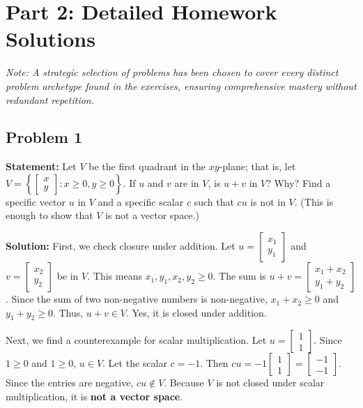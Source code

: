 \documentclass[12pt]{article}
\begin{document}
\newpage

\section{Part 2: Detailed Homework Solutions}
\textit{Note: A strategic selection of problems has been chosen to cover every distinct problem archetype found in the exercises, ensuring comprehensive mastery without redundant repetition.}

\subsection{Problem 1}
\textbf{Statement:} Let $V$ be the first quadrant in the $xy$-plane; that is, let $V = \left\{ \begin{bmatrix} x \\ y \end{bmatrix} : x \ge 0, y \ge 0 \right\}$. If $u$ and $v$ are in $V$, is $u+v$ in $V$? Why? Find a specific vector $u$ in $V$ and a specific scalar $c$ such that $cu$ is not in $V$. (This is enough to show that $V$ is not a vector space.)

\textbf{Solution:}
First, we check closure under addition. Let $u = \begin{bmatrix} x_1 \\ y_1 \end{bmatrix}$ and $v = \begin{bmatrix} x_2 \\ y_2 \end{bmatrix}$ be in $V$. This means $x_1, y_1, x_2, y_2 \ge 0$.
The sum is $u + v = \begin{bmatrix} x_1 + x_2 \\ y_1 + y_2 \end{bmatrix}$.
Since the sum of two non-negative numbers is non-negative, $x_1 + x_2 \ge 0$ and $y_1 + y_2 \ge 0$. Thus, $u+v \in V$. Yes, it is closed under addition.

Next, we find a counterexample for scalar multiplication. 
Let $u = \begin{bmatrix} 1 \\ 1 \end{bmatrix}$. Since $1 \ge 0$ and $1 \ge 0$, $u \in V$.
Let the scalar $c = -1$.
Then $cu = -1 \begin{bmatrix} 1 \\ 1 \end{bmatrix} = \begin{bmatrix} -1 \\ -1 \end{bmatrix}$.
Since the entries are negative, $cu \notin V$. 
Because $V$ is not closed under scalar multiplication, it is \textbf{not a vector space}.
\end{document}
